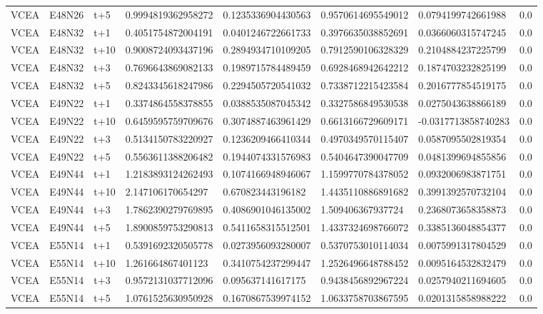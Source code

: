 \begin{landscape}
\begin{longtable}{llllllll}
VCEA & E48N26 & t+5 & 0.9994819362958272 & 0.1235336904430563 & 0.9570614695549012 & 0.0794199742661988 & 0.0 \\
VCEA & E48N32 & t+1 & 0.4051754872004191 & 0.0401246722661733 & 0.3976635038852691 & 0.0366060315747245 & 0.0 \\
VCEA & E48N32 & t+10 & 0.9008724093437196 & 0.2894934710109205 & 0.7912590106328329 & 0.2104884237225799 & 0.0 \\
VCEA & E48N32 & t+3 & 0.7696643869082133 & 0.1989715784489459 & 0.6928468942642212 & 0.1874703232825199 & 0.0 \\
VCEA & E48N32 & t+5 & 0.8243345618247986 & 0.2294505720541032 & 0.7338712215423584 & 0.2016777854519175 & 0.0 \\
VCEA & E49N22 & t+1 & 0.3374864558378855 & 0.0388535087045342 & 0.3327586849530538 & 0.0275043638866189 & 0.0 \\
VCEA & E49N22 & t+10 & 0.6459595759709676 & 0.3074887463961429 & 0.6613166729609171 & -0.0317713858740283 & 0.0 \\
VCEA & E49N22 & t+3 & 0.5134150783220927 & 0.1236209466410344 & 0.4970349570115407 & 0.0587095502819354 & 0.0 \\
VCEA & E49N22 & t+5 & 0.5563611388206482 & 0.1944074331576983 & 0.5404647390047709 & 0.0481399694855856 & 0.0 \\
VCEA & E49N44 & t+1 & 1.2183893124262493 & 0.1074166948946067 & 1.1599770784378052 & 0.0932006983871751 & 0.0 \\
VCEA & E49N44 & t+10 & 2.147106170654297 & 0.670823443196182 & 1.4435110886891682 & 0.3991392570732104 & 0.0 \\
VCEA & E49N44 & t+3 & 1.7862390279769895 & 0.4086901046135002 & 1.509406367937724 & 0.2368073658358873 & 0.0 \\
VCEA & E49N44 & t+5 & 1.8900859753290813 & 0.5411658315512501 & 1.4337324698766072 & 0.3385136048854377 & 0.0 \\
VCEA & E55N14 & t+1 & 0.5391692320505778 & 0.0273956093280007 & 0.5370753010114034 & 0.0075991317804529 & 0.0 \\
VCEA & E55N14 & t+10 & 1.261664867401123 & 0.3410754237299447 & 1.2526496648788452 & 0.0095164532832479 & 0.0 \\
VCEA & E55N14 & t+3 & 0.9572131037712096 & 0.095637141617175 & 0.9438456892967224 & 0.0257940211694605 & 0.0 \\
VCEA & E55N14 & t+5 & 1.0761525630950928 & 0.1670867539974152 & 1.0633758703867595 & 0.0201315858988222 & 0.0 \\

\end{longtable}
\end{landscape}
